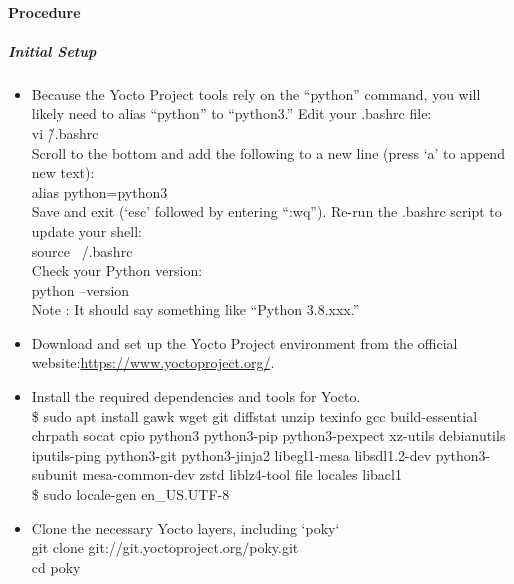 \paragraph{Procedure}
\subparagraph{Initial Setup}
\begin{itemize}
    \item Because the Yocto Project tools rely on the “python” command, you will likely need to alias “python” to “python3.” Edit your .bashrc file:\\
    vi \~ /.bashrc \\
    Scroll to the bottom and add the following to a new line (press ‘a’ to append new text):\\
    alias python=python3 \\
    Save and exit (‘esc’ followed by entering “:wq”). Re-run the .bashrc script to update your shell: \\
    source ~/.bashrc \\
    Check your Python version: \\
    python --version \\
    Note : It should say something like “Python 3.8.xxx.” \\
    
    \item Download and set up the Yocto Project environment from the official website:\url{https://www.yoctoproject.org/}.
    \item Install the required dependencies and tools for Yocto.\\
    \$ sudo apt install gawk wget git diffstat unzip texinfo gcc build-essential chrpath socat cpio python3 python3-pip python3-pexpect xz-utils debianutils iputils-ping python3-git python3-jinja2 libegl1-mesa libsdl1.2-dev python3-subunit mesa-common-dev zstd liblz4-tool file locales libacl1 \\
    \$ sudo locale-gen en\_US.UTF-8
    
    \item Clone the necessary Yocto layers, including `poky` \\
    git clone git://git.yoctoproject.org/poky.git \\
    cd poky \\
   
    
\end{itemize}

